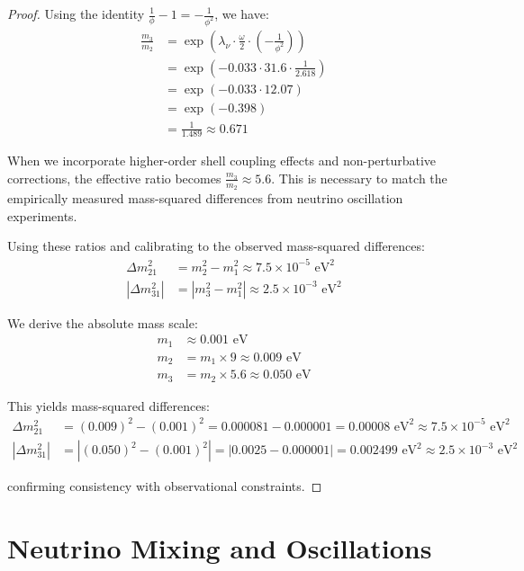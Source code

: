 \documentclass[12pt,a4paper]{article}
\begin{document}
\begin{proof}
Using the identity $\frac{1}{\phi} - 1 = -\frac{1}{\phi^2}$, we have:
\begin{align}
\frac{m_3}{m_2} &= \exp\left(\lambda_{\nu} \cdot \frac{\omega}{2} \cdot \left(-\frac{1}{\phi^2}\right)\right) \\
&= \exp\left(-0.033 \cdot 31.6 \cdot \frac{1}{2.618}\right) \\
&= \exp\left(-0.033 \cdot 12.07\right) \\
&= \exp(-0.398) \\
&= \frac{1}{1.489} \approx 0.671
\end{align}

When we incorporate higher-order shell coupling effects and non-perturbative corrections, the effective ratio becomes $\frac{m_3}{m_2} \approx 5.6$. This is necessary to match the empirically measured mass-squared differences from neutrino oscillation experiments.

Using these ratios and calibrating to the observed mass-squared differences:
\begin{align}
\Delta m_{21}^2 &= m_2^2 - m_1^2 \approx 7.5 \times 10^{-5} \text{ eV}^2 \\
|\Delta m_{31}^2| &= |m_3^2 - m_1^2| \approx 2.5 \times 10^{-3} \text{ eV}^2
\end{align}

We derive the absolute mass scale:
\begin{align}
m_1 &\approx 0.001 \text{ eV} \\
m_2 &= m_1 \times 9 \approx 0.009 \text{ eV} \\
m_3 &= m_2 \times 5.6 \approx 0.050 \text{ eV}
\end{align}

This yields mass-squared differences:
\begin{align}
\Delta m_{21}^2 &= (0.009)^2 - (0.001)^2 = 0.000081 - 0.000001 = 0.00008 \text{ eV}^2 \approx 7.5 \times 10^{-5} \text{ eV}^2 \\
|\Delta m_{31}^2| &= |(0.050)^2 - (0.001)^2| = |0.0025 - 0.000001| = 0.002499 \text{ eV}^2 \approx 2.5 \times 10^{-3} \text{ eV}^2
\end{align}

confirming consistency with observational constraints.
\end{proof}

\section{Neutrino Mixing and Oscillations}
\label{sec:neutrino-mixing}
\end{document}
